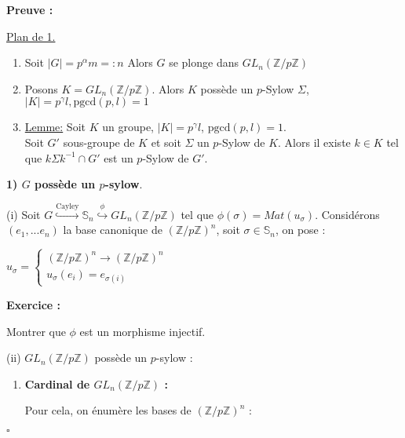 \documentclass{report}
\renewenvironment{leftbar}{%
  \def\FrameCommand{\vrule width 0.4pt \hspace{10pt}}%
  \MakeFramed {\advance\hsize-\width \FrameRestore}}%
 {\endMakeFramed}%
\newenvironment{preuve}{\vspace*{0.5cm}
    \begin{leftbar}
    \noindent\textbf{Preuve :}\par}{
    \begin{flushright}
    $\square$
    \end{flushright}
    \end{leftbar}
}
\newenvironment{exo}{\begin{tcolorbox}[colframe= white]
    \textbf{Exercice :}
    \par}
    {\end{tcolorbox}}
\newcommand{\Z}{\mathbb{Z}}
\begin{document}
\begin{preuve}
    \underline{Plan de 1.}
    \begin{enumerate}
        \item Soit $|G| = p^{\alpha}m =: n$ Alors $G$ se plonge dans $GL_n(\Z / p\Z)$
        \item Posons $K = GL_n(\Z / p\Z).$ Alors $K$ possède un $p$-Sylow $\Sigma$, $|K| = p^{\gamma}l, \text{pgcd}(p,l) = 1$
    \item \underline{Lemme:} Soit $K$ un groupe, $|K| = p^{\gamma}l$, $\text{pgcd}(p,l) = 1$.\\
    Soit $G'$ sous-groupe de $K$ et soit $\Sigma$ un $p$-Sylow de $K$. Alors il existe $k \in K$ tel que $k \Sigma k^{-1} \cap G'$ est un $p$-Sylow de $G'$.
    \end{enumerate}

    \textbf{1) $G$ possède un $p$-sylow}. 
    
    \bigbreak
        
        (i) Soit $G \overset{\text{Cayley}}{\hookrightarrow} \mathbb{S}_n \overset{\phi}{\hookrightarrow} GL_n \left( \Z / p\Z \right) $ tel que $\phi (\sigma)=Mat(u_\sigma)$. Considérons $(e_1, ...e_n) $ la base canonique de $\left( \Z / p\Z \right) ^n$, soit $\sigma \in \mathbb{S}_n$, on pose : 
        
        \begin{center}
            $u_\sigma = \left\{
            \begin{array}{ll}
                \left( \Z /p\Z \right) ^n \longrightarrow \left( \Z /p\Z \right) ^n& \\
                u_\sigma (e_i)=e_{\sigma(i)}& 
            \end{array}
        \right.$
        \end{center}
        
        \begin{exo}
            Montrer que $\phi$ est un morphisme injectif. 
        \end{exo}
    
        (ii) $GL_n\left( \Z /p\Z \right) $ possède un $p$-sylow : 
        
        \begin{enumerate}
            
            \item \textbf{Cardinal de $GL_n\left( \Z /p\Z \right) $ : }
            
            \newline Pour cela, on énumère les bases de $\left( \Z /p\Z \right) ^n$ : 
            

\end{enumerate}
\end{preuve}
\end{document}
